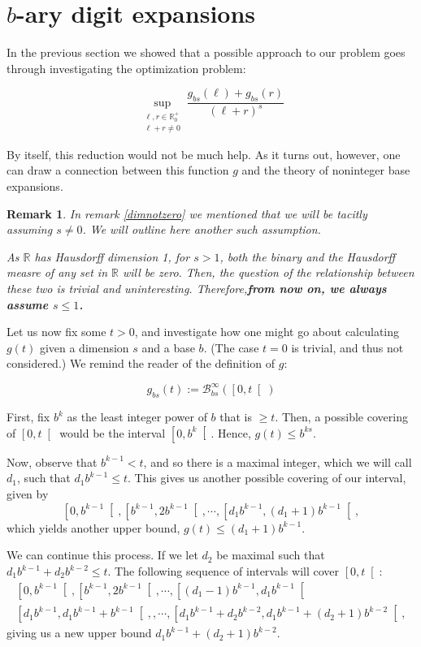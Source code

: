 \documentclass[11pt, reqno]{amsart}
\newcommand{\R}{\mathbb{R}}
\newcommand{\BB}{\mathcal{B}}
\newtheorem{remark}{Remark}
\begin{document}
\section{$b$-ary digit expansions}\label{sec6}

In the previous section we showed that a possible approach to our problem goes through investigating the optimization problem:

\[ \sup_{\substack{\ell,r \in \R^+_0\\\ell+r \neq 0}} \frac{g_{bs}(\ell) + g_{bs}(r)}{(\ell + r)^s} \]

By itself, this reduction would not be much help. As it turns out, however, one can draw a connection between this function $g$ and the theory of noninteger base expansions.

\begin{remark}
In remark \ref{dimnotzero} we mentioned that we will be tacitly assuming $s \neq 0$. We will outline here another such assumption.

As $\R$ has Hausdorff dimension 1, for $s > 1$, both the binary and the Hausdorff measre of \emph{any} set in $\R$ will be zero. Then, the question of the relationship between these two is trivial and uninteresting. Therefore,\textbf{from now on, we always assume $s \leq 1$.}
\end{remark}

Let us now fix some $t > 0$, and investigate how one might go about calculating $g(t)$ given a dimension $s$ and a base $b$. (The case $t = 0$ is trivial, and thus not considered.) We remind the reader of the definition of $g$:

\[g_{bs}(t) := \BB_{bs}^\infty(\left[0, t \right[)\]

First, fix $b^k$ as the least integer power of $b$ that is $\geq t$. Then, a possible covering of $\left[0, t \right[$ would be the interval $\left[0, b^k\right[$. Hence, $g(t) \leq b^{ks}$.

Now, observe that $b^{k-1} < t$, and so there is a maximal integer, which we will call $d_1$, such that $d_1 b^{k-1} \leq t$. This gives us another possible covering of our interval, given by
\[\left[0, b^{k-1} \right[, \left[b^{k-1}, 2 b^{k-1} \right[, \cdots, \left[d_1 b^{k-1}, (d_1 + 1) b^{k-1} \right[,\]
which yields another upper bound, $g(t) \leq (d_1 + 1) b^{k-1}$.

We can continue this process. If we let $d_2$ be maximal such that $d_1 b^{k-1} + d_2 b^{k-2} \leq t$. The following sequence of intervals will cover $\left[0, t \right[$:
\begin{multline*}
\left[0, b^{k-1} \right[, \left[b^{k-1}, 2 b^{k-1} \right[, \cdots, \left[(d_1 - 1) b^{k-1}, d_1 b^{k-1} \right[ \\
\left[d_1 b^{k-1}, d_1 b^{k-1} + b^{k-1} \right[, , \cdots, \left[d_1 b^{k-1} + d_2 b^{k-2}, d_1 b^{k-1} + (d_2 + 1) b^{k-2} \right[,
\end{multline*}
giving us a new upper bound $d_1 b^{k-1} + (d_2 + 1) b^{k-2}$.
\end{document}
